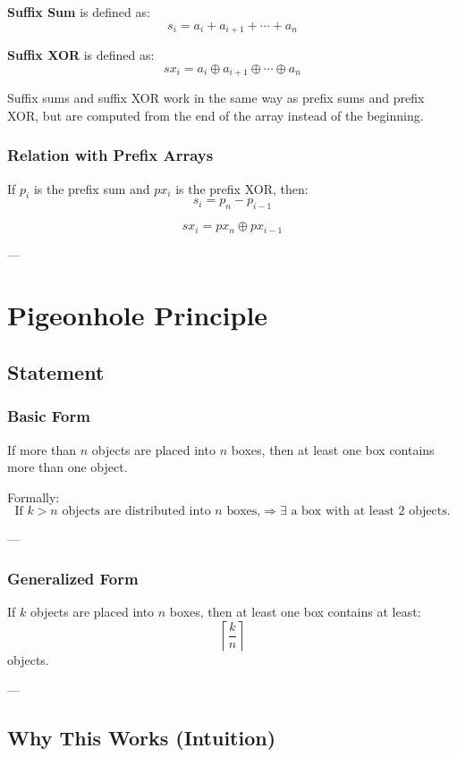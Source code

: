 \documentclass[11pt]{article}
\begin{document}
\textbf{Suffix Sum} is defined as:
\[
s_i = a_i + a_{i+1} + \cdots + a_n
\]

\textbf{Suffix XOR} is defined as:
\[
sx_i = a_i \oplus a_{i+1} \oplus \cdots \oplus a_n
\]

Suffix sums and suffix XOR work in the same way as prefix sums and prefix XOR,
but are computed from the end of the array instead of the beginning.

\subsubsection{Relation with Prefix Arrays}

If $p_i$ is the prefix sum and $px_i$ is the prefix XOR, then:
\[
s_i = p_n - p_{i-1}
\]

\[
sx_i = px_n \oplus px_{i-1}
\]

---

\section{Pigeonhole Principle}

\subsection{Statement}

\subsubsection{Basic Form}
If more than $n$ objects are placed into $n$ boxes, then at least one box
contains more than one object.

Formally:
\[
\text{If } k > n \text{ objects are distributed into } n \text{ boxes,}
\Rightarrow \exists \text{ a box with at least } 2 \text{ objects.}
\]

---

\subsubsection{Generalized Form}
If $k$ objects are placed into $n$ boxes, then at least one box contains at least:
\[
\left\lceil \frac{k}{n} \right\rceil
\]
objects.

---

\subsection{Why This Works (Intuition)}
\end{document}
